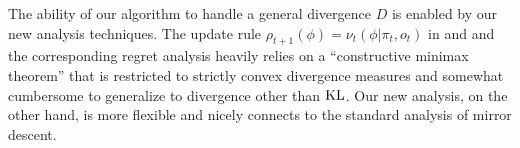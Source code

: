 The ability of our algorithm to handle a general divergence $D$ is enabled by our new analysis techniques. The update rule $\rho_{t+1}(\phi)=\nu_t(\phi|\pi_t, o_t)$ in \cite{xu2023bayesian} and \cite{liu2025decision} and the corresponding regret analysis heavily relies on a ``constructive minimax theorem'' \citep{xu2023bayesian} that is restricted to strictly convex divergence measures and somewhat cumbersome to generalize to divergence other than $\text{KL}$. Our new analysis, on the other hand, is more flexible and nicely connects to the standard analysis of mirror descent. 



